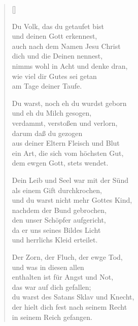 \begin{multicols}{2}
\settowidth{\versewidth}{Dein Leib und Seel war mit der Sünd}
\begin{verse}[\versewidth]

 Du Volk, das du getaufet bist\\
und deinen Gott erkennest,\\
auch nach dem Namen Jesu Christ\\
dich und die Deinen nennest,\\
nimms wohl in Acht und denke dran,\\
wie viel dir Gutes sei getan\\
am Tage deiner Taufe.

 Du warst, noch eh du wurdst geborn\\
und eh du Milch gesogen,\\
verdammt, verstoßen und verlorn,\\
darum daß du gezogen\\
aus deiner Eltern Fleisch und Blut\\
ein Art, die sich vom höchsten Gut,\\
dem ewgen Gott, stets wendet.

 Dein Leib und Seel war mit der Sünd\\
als einem Gift durchkrochen,\\
und du warst nicht mehr Gottes Kind,\\
nachdem der Bund gebrochen,\\
den unser Schöpfer aufgericht,\\
da er uns seines Bildes Licht\\
und herrlichs Kleid erteilet.

 Der Zorn, der Fluch, der ewge Tod,\\
und was in diesen allen\\
enthalten ist für Angst und Not,\\
das war auf dich gefallen;\\
du warst des Satans Sklav und Knecht,\\
der hielt dich fest nach seinem Recht\\
in seinem Reich gefangen.


\end{verse}
\end{multicols}
